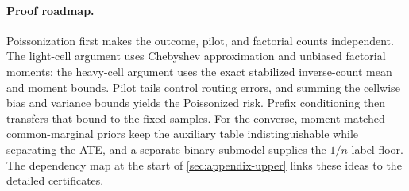 \paragraph{Proof roadmap.}
Poissonization first makes the outcome, pilot, and factorial counts independent. The light-cell argument uses Chebyshev approximation and unbiased factorial moments; the heavy-cell argument uses the exact stabilized inverse-count mean and moment bounds. Pilot tails control routing errors, and summing the cellwise bias and variance bounds yields the Poissonized risk. Prefix conditioning then transfers that bound to the fixed samples. For the converse, moment-matched common-marginal priors keep the auxiliary table indistinguishable while separating the ATE, and a separate binary submodel supplies the \(1/n\) label floor. The dependency map at the start of \cref{sec:appendix-upper} links these ideas to the detailed certificates.
